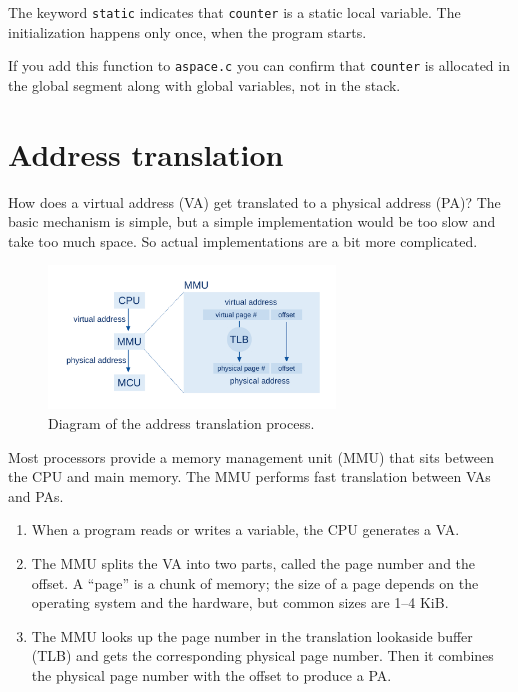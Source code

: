 \documentclass[12pt]{book}
\begin{document}
{The keyword {\tt static} indicates that {\tt counter} is a static
local variable.  The initialization happens only once, when the program
starts.

If you add this function to {\tt aspace.c} you can confirm that
{\tt counter} is allocated in the global segment along with global
variables, not in the stack.


\section{Address translation}
\label{address_translation}

How does a virtual address (VA) get translated to a physical address (PA)?
The basic mechanism is simple, but a simple
implementation would be too slow and take too much space.  So actual
implementations are a bit more complicated.

\begin{figure}
\centerline{\includegraphics[width=3in]{figs/address_translation.pdf}}
\caption{Diagram of the address translation process.}
\label{addtrans}
\end{figure}

Most processors provide a memory management unit (MMU) that sits between the CPU and main memory.  The MMU performs fast translation between VAs and PAs.

\begin{enumerate}

\item When a program reads or writes a variable, the CPU generates a
VA.  

\item The MMU splits the VA into two parts, called the page number and
the offset.  A ``page'' is a chunk of memory; the size of a page
depends on the operating system and the hardware, but common sizes
are 1--4 KiB.

\item The MMU looks up the page number in the translation lookaside buffer (TLB) and gets the corresponding physical page number.  Then it combines
the physical page number with the offset to produce a PA.


\end{enumerate}}
\end{document}
